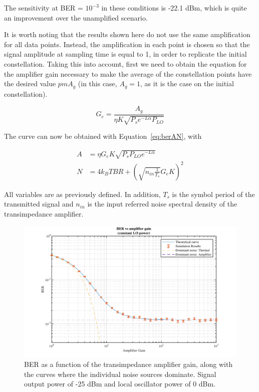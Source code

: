 The sensitivity at BER = $10^{-3}$ in these conditions is -22.1 dBm, which is 
quite an improvement over the unamplified scenario.

It is worth noting that the results shown here do not use the same 
amplification for all data points. Instead, the amplification in each point is 
chosen so that the signal amplitude at sampling time is equal to 1, in order to 
replicate the initial constellation.
Taking this into account, first we need to obtain the equation for the 
amplifier gain necessary to make the average of the constellation points have 
the desired value $pm A_g$ (in this case, $A_g = 1$, as it is the case on the 
initial constellation).

\begin{equation}
G_e = \frac{A_g}{\eta K \sqrt{P_s e^{-L\alpha}P_{LO}}}
\end{equation}

The curve can now be obtained with Equation~\ref{eq:berAN}, with

\begin{equation}\label{eq:berANAmped}
\begin{split}
	A &= \eta G_e K \sqrt{ P_s P_{LO} e^{-L\alpha}}\\
	N &= {4 k_B T B R} + \left(\sqrt{n_{in} \frac{1}{T_s}} G_e K\right)^2
\end{split}
\end{equation}

All variables are as previously defined. In addition, $T_s$ is the symbol 
period of the transmitted signal and $n_{in}$ is the input referred noise 
spectral density of the transimpedance amplifier.



	\begin{figure}[H]
	\centering
	\includegraphics[width=1\textwidth]
	{sdf/m_qam_system/figures/simulations/03_eNoise/berVsAmpGain.pdf}
	\caption{BER as a function of the transimpedance amplifier 
	gain, along with the curves where the individual noise sources dominate. 
	Signal output power of -25 dBm and local oscillator power of 0 dBm.
	}\label{fig:eNoise_varAmp_berVsAmpGain}
\end{figure}


